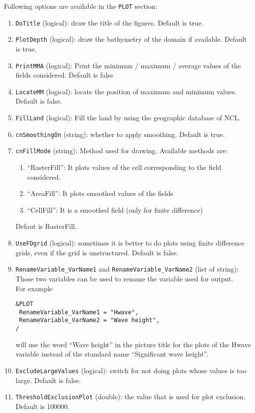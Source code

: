 \documentclass[12pt]{amsart}
\begin{document}
Following options are available in the {\tt PLOT} section:
\begin{enumerate}
\item {\tt DoTitle} (logical): draw the title of the figures. Default is true.
\item {\tt PlotDepth} (logical): draw the bathymetry of the domain if available. Default is true.
\item {\tt PrintMMA} (logical): Print the minimum / maximum / average values of the fields considered. Default is false
\item {\tt LocateMM} (logical): locate the position of maximum and minimum values. Default is false.
\item {\tt FillLand} (logical): Fill the land by using the geographic database of NCL.
\item {\tt cnSmoothingOn} (string): whether to apply smoothing. Default is true.
\item {\tt cnFillMode} (string): Method used for drawing. Available methods are:
  \begin{enumerate}
  \item ``RasterFill'': It plots values of the cell corresponding to the field considered.
  \item ``AreaFill'': It plots smoothed values of the fields
  \item ``CellFill'': It is a smoothed field (only for finite difference)
  \end{enumerate}
  Defaut is RasterFill.
\item {\tt UseFDgrid} (logical): sometimes it is better to do plots
using finite difference grids, even if the grid is unstructured. Default is false.
\item {\tt RenameVariable\_VarName1} and {\tt RenameVariable\_VarName2} (list of string): Those two variables can be used to rename the variable used for output.\\
  For example
\begin{verbatim}
&PLOT
 RenameVariable_VarName1 = "Hwave", 
 RenameVariable_VarName2 = "Wave height", 
/
\end{verbatim}
will use the word ``Wave height'' in the picture title for the plots of the Hwave variable instead of the standard name ``Significant wave height''.
\item {\tt ExcludeLargeValues} (logical): switch for not doing plots whose values is too large. Default is false.
\item {\tt ThresholdExclusionPlot} (double): the value that is used for plot exclusion. Default is 100000.
\end{enumerate}
\end{document}
